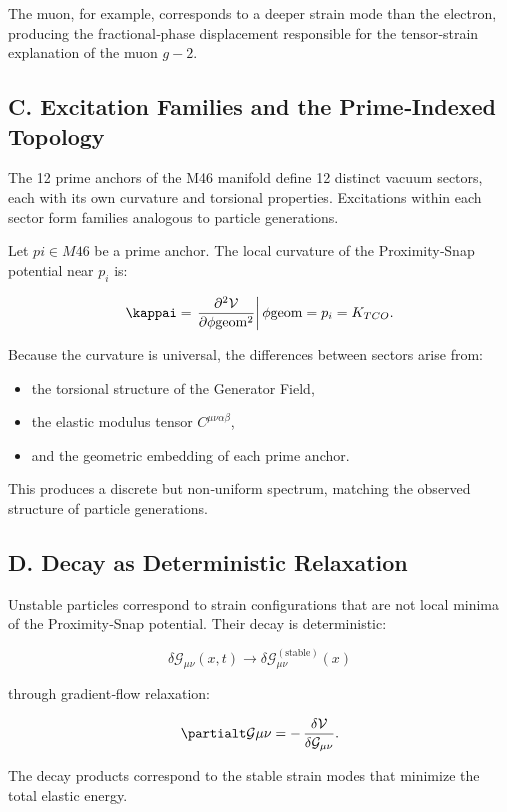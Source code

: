 \documentclass[reprint,amsmath,amssymb,aps,prl,floatfix]{revtex4-2}
\begin{document}
The muon, for example, corresponds to a deeper strain mode than the electron, producing the fractional‑phase displacement responsible for the tensor‑strain explanation of the muon \(g-2\).

\subsection{C. Excitation Families and the Prime‑Indexed Topology}

The 12 prime anchors of the M46 manifold define 12 distinct vacuum sectors, each with its own curvature and torsional properties. Excitations within each sector form families analogous to particle generations.
\medskip

Let \(pi \in M{46}\) be a prime anchor. The local curvature of the Proximity‑Snap potential near \(p_i\) is:

\[
\kappai = \left.\frac{\partial^2 \mathcal{V}}{\partial \phi{\mathrm{geom}}^2}\right|{\phi{\mathrm{geom}} = p_i}
= K_{TCO}.
\]
\medskip

Because the curvature is universal, the differences between sectors arise from:
\begin{itemize}
\item the torsional structure of the Generator Field,  
\item the elastic modulus tensor \(C^{\mu\nu\alpha\beta}\),  
\item and the geometric embedding of each prime anchor.
\end{itemize}

This produces a discrete but non‑uniform spectrum, matching the observed structure of particle generations.

\subsection{D. Decay as Deterministic Relaxation}

Unstable particles correspond to strain configurations that are not local minima of the Proximity‑Snap potential. Their decay is deterministic:

\[
\delta\mathcal{G}_{\mu\nu}(x,t)
\longrightarrow
\delta\mathcal{G}_{\mu\nu}^{(\mathrm{stable})}(x)
\]

through gradient‑flow relaxation:

\[
\partialt \mathcal{G}{\mu\nu}
=
-\,\frac{\delta \mathcal{V}}{\delta \mathcal{G}_{\mu\nu}}.
\]

The decay products correspond to the stable strain modes that minimize the total elastic energy.
\end{document}
